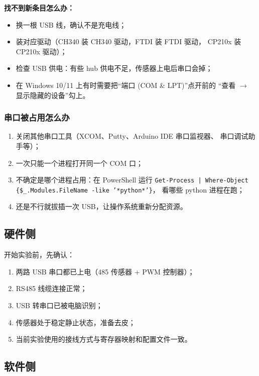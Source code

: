 \documentclass[11pt,a4paper]{ctexart}
\begin{document}
\textbf{找不到新条目怎么办：}

\begin{itemize}[leftmargin=2em]
  \item 换一根 USB 线，确认不是充电线；
  \item 装对应驱动（CH340 装 CH340 驱动，FTDI 装 FTDI 驱动，
        CP210x 装 CP210x 驱动）；
  \item 检查 USB 供电：有些 hub 供电不足，传感器上电后串口会掉；
  \item 在 Windows 10/11 上有时需要把“端口 (COM \& LPT)”点开前的
        “查看 $\rightarrow$ 显示隐藏的设备”勾上。
\end{itemize}

\subsubsection{串口被占用怎么办}

\begin{enumerate}[leftmargin=2em]
  \item 关闭其他串口工具（XCOM、Putty、Arduino IDE 串口监视器、
        串口调试助手等）；
  \item 一次只能一个进程打开同一个 COM 口；
  \item 不确定是哪个进程占用：在 PowerShell 运行
        \texttt{Get-Process | Where-Object \{\$\_.Modules.FileName -like '*python*'\}}，
        看哪些 python 进程在跑；
  \item 还是不行就拔插一次 USB，让操作系统重新分配资源。
\end{enumerate}

\subsection{硬件侧}

开始实验前，先确认：

\begin{enumerate}[leftmargin=2em]
  \item 两路 USB 串口都已上电（485 传感器 + PWM 控制器）；
  \item RS485 线缆连接正常；
  \item USB 转串口已被电脑识别；
  \item 传感器处于稳定静止状态，准备去皮；
  \item 当前实验使用的接线方式与寄存器映射和配置文件一致。
\end{enumerate}

\subsection{软件侧}
\end{document}
